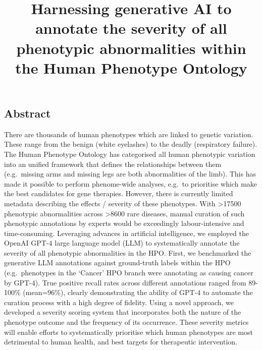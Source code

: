 \documentclass[
]{agujournal2019}
\begin{document}
\title{Harnessing generative AI to annotate the severity of all
phenotypic abnormalities within the Human Phenotype Ontology}







\subsection{Abstract}\label{abstract}

There are thousands of human phenotypes which are linked to genetic
variation. These range from the benign (white eyelashes) to the deadly
(respiratory failure). The Human Phenotype Ontology has categorised all
human phenotypic variation into an unified framework that defines the
relationships between them (e.g.~missing arms and missing legs are both
abnormalities of the limb). This has made it possible to perform
phenome-wide analyses, e.g.~to prioritise which make the best candidates
for gene therapies. However, there is currently limited metadata
describing the effects / severity of these phenotypes. With
\textgreater17500 phenotypic abnormalities across \textgreater8600 rare
diseases, manual curation of such phenotypic annotations by experts
would be exceedingly labour-intensive and time-consuming. Leveraging
advances in artificial intelligence, we employed the OpenAI GPT-4 large
language model (LLM) to systematically annotate the severity of all
phenotypic abnormalities in the HPO. First, we benchmarked the
generative LLM annotations against ground-truth labels within the HPO
(e.g.~phenotypes in the `Cancer' HPO branch were annotating as causing
cancer by GPT-4). True positive recall rates across different
annotations ranged from 89-100\% (mean=96\%), clearly demonstrating the
ability of GPT-4 to automate the curation process with a high degree of
fidelity. Using a novel approach, we developed a severity scoring system
that incorporates both the nature of the phenotype outcome and the
frequency of its occurrence. These severity metrics will enable efforts
to systematically prioritise which human phenotypes are most detrimental
to human health, and best targets for therapeutic intervention.
\end{document}
